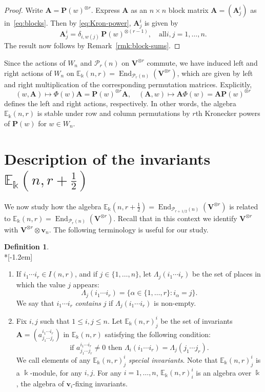 \documentclass[10pt]{article}
\theoremstyle{definition}
\newtheorem{defi}[theorem]{Definition}
\DeclareMathOperator{\End}{End}
\newcommand{\E}{\mathbb{E}}
\newcommand{\Ptn}{\mathcal{P}}
\newcommand{\bA}{\mathbf{A}}
\newcommand{\bP}{\mathbf{P}}
\newcommand{\V}{\mathbf{V}} %
\newcommand{\bv}{\mathbf{v}} %
\newcommand{\half}{\, 1/2} %
\newcommand{\fhalf}{\frac{1}{2}} %
\begin{document}
\begin{proof}
Write $\bA = \bP(w)^{\otimes r}$. Express $\bA$ as an $n \times n$
block matrix $\bA = (\bA^i_j)$ as in~\eqref{eq:blocks}. Then by
\eqref{eq:Kron-power}, $\bA^i_j$ is given by
\[
\bA^i_j = \delta_{i, w(j)} \, \bP(w)^{\otimes (r-1)}, \quad \text{all
} i,j = 1, \dots, n.
\]
The result now follows by Remark~\ref{rmk:block-sums}. 
\end{proof}

Since the actions of $W_n$ and $\Ptn_r(n)$ on $\V^{\otimes r}$
commute, we have induced left and right actions of $W_n$ on
$\E_\Bbbk(n,r) = \End_{\Ptn_r(n)}(\V^{\otimes r})$, which are given by
left and right multiplication of the corresponding permutation
matrices. Explicitly,
\begin{equation}\label{eq:W_n-actions}
 (w, \bA) \mapsto \Phi(w) \bA = \bP(w)^{\otimes r} \bA, \quad
 (\bA,w) \mapsto \bA \Phi(w) = \bA \bP(w)^{\otimes r} 
\end{equation}
defines the left and right actions, respectively. In other words, the
algebra $\E_\Bbbk(n,r)$ is stable under row and column permutations by
$r$th Kronecker powers of $\bP(w)$ for $w \in W_n$. 


\section{Description of the invariants \texorpdfstring{$\E_\Bbbk(n,r+\fhalf)$}{Ek (n,r+1/2)}}%
\label{sec:special}%
We now study how the algebra $\E_\Bbbk(n,r+\fhalf)
= \End_{\Ptn_{r+\half}(n)}(\V^{\otimes r})$ is related to
$\E_\Bbbk(n,r) = \End_{\Ptn_r(n)}(\V^{\otimes r})$. Recall that in
this context we identify $\V^{\otimes r}$ with $\V^{\otimes r}
\otimes \bv_n$. The following terminology is useful for our study.

\begin{defi}\label{def:special}\ \\*[-1.2em]
\begin{enumerate}[label=(\alph*)] 
\item \label{defi4.1_i}
If $i_1 \cdots i_r \in I(n,r)$, and if $j \in \{1, \dots, n\}$,
let $\Lambda_j(i_1 \cdots i_r)$ be the set of places in which the
value $j$ appears:
\[
\Lambda_j(i_1 \cdots i_r) = \{ \alpha \in \{1, \dots, r\} : i_\alpha =
j \}.
\]
We say that $i_1\cdots i_r$ \emph{contains} $j$ if $\Lambda_j(i_1
\cdots i_r)$ is non-empty.


\item \label{defi4.1_ii}
 Fix $i,j$ such that $1 \le i,j \le n$. Let $\E_\Bbbk(n,r)^i_j$ be
the set of invariants $\bA = (a^{i_1 \cdots i_r}_{j_1 \cdots j_r})$ in
$\E_\Bbbk(n,r)$ satisfying the following condition:
\[
\text{if $a^{i_1 \cdots i_r}_{j_1 \cdots j_r} \ne 0$ then
 $\Lambda_i(i_1 \cdots i_r) = \Lambda_j(j_1 \cdots j_r)$.}
\]
We call elements of any $\E_\Bbbk(n,r)^i_j$ \emph{special
 invariants}. Note that $\E_\Bbbk(n,r)^i_j$ is a $\Bbbk$-module, for
any $i,j$. For any $i = 1, \dots, n$, $\E_\Bbbk(n,r)^i_i$ is an
algebra over $\Bbbk$, the algebra of $\bv_i$-fixing invariants.
\end{enumerate}
\end{defi}
\end{document}
